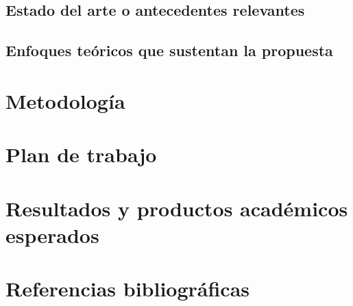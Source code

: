 \documentclass[11pt,a4paper]{article}
\begin{document}
\subsection{Estado del arte o antecedentes relevantes}
\label{subsec:estado_arte}

\subsection{Enfoques teóricos que sustentan la propuesta}
\label{subsec:enfoques}


\section{Metodología}
\label{sec:metodologia}



\section{Plan de trabajo}
\label{sec:plan_trabajo}



\section{Resultados y productos académicos esperados}
\label{sec:resultados}


\section{Referencias bibliográficas}
\printbibliography[heading=none]
\end{document}

